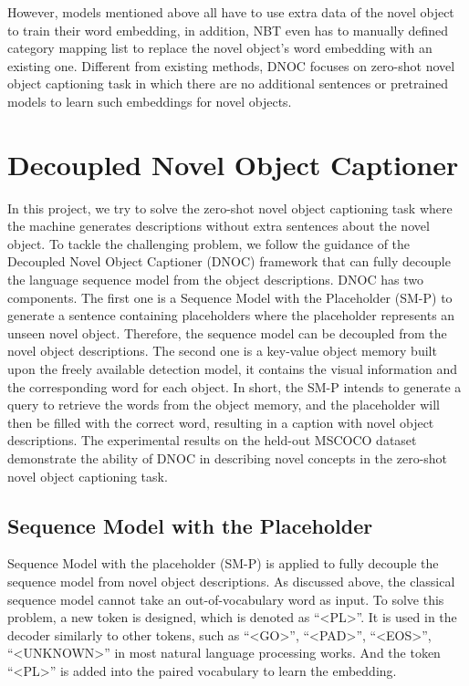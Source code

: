 \documentclass[a4paper, 11pt]{article} %
\begin{document}
However, models mentioned above all have to use extra data of the novel object to train
their word embedding, in addition, NBT even has to manually defined category mapping list
to replace the novel object's word embedding with an existing one. Different from existing
methods, DNOC focuses on zero-shot novel object captioning task in which there are no
additional sentences or pretrained models to learn such embeddings for novel objects.

\bigskip


\section{\textbf{Decoupled Novel Object Captioner}}

In this project, we try to solve the zero-shot novel object captioning task where the
machine generates descriptions without extra sentences about the novel object. To tackle
the challenging problem, we follow the guidance of the Decoupled Novel Object Captioner
(DNOC) framework that can fully decouple the language sequence model from the object
descriptions. DNOC has two components. The first one is a Sequence Model with the Placeholder
(SM-P) to generate a sentence containing placeholders where the placeholder represents an
unseen novel object. Therefore, the sequence model can be decoupled from the novel object
descriptions. The second one is a key-value object memory built upon the freely available
detection model, it contains the visual information and the corresponding word for each
object. In short, the SM-P intends to generate a query to retrieve the words from the object
memory, and the placeholder will then be filled with the correct word, resulting in a caption
with novel object descriptions. The experimental results on the held-out MSCOCO dataset
demonstrate the ability of DNOC in describing novel concepts in the zero-shot novel object
captioning task.

\subsection{\textbf{Sequence Model with the Placeholder}}

Sequence Model with the placeholder (SM-P) is applied to fully decouple the sequence model
from novel object descriptions. As discussed above, the classical sequence model cannot
take an out-of-vocabulary word as input. To solve this problem, a new token is designed,
which is denoted as ``\textless PL\textgreater''. It is used in the decoder similarly to
other tokens, such as ``\textless GO\textgreater'', ``\textless PAD\textgreater'',
``\textless EOS\textgreater'', ``\textless UNKNOWN\textgreater'' in most natural language
processing works. And the token ``\textless PL\textgreater'' is added into the paired
vocabulary to learn the embedding.
\end{document}
